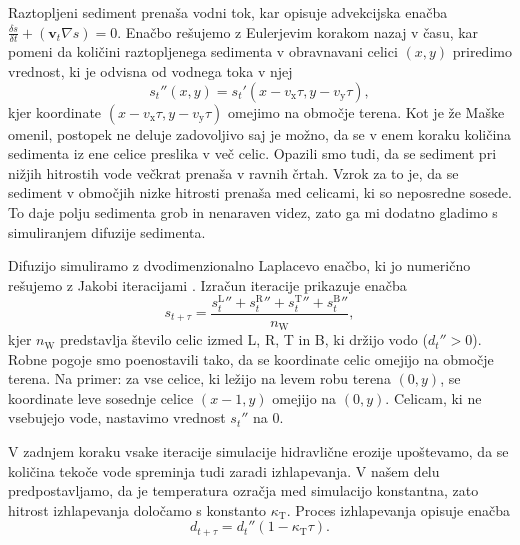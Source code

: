 \documentclass[9pt]{pnas-new}
\renewcommand{\vec}[1]{\ensuremath{\mathbf{#1}}}
\newcommand{\const}[1]{{\ensuremath{\kappa_\mathrm{#1}}}}
\begin{document}
Raztopljeni sediment prenaša vodni tok, kar opisuje advekcijska enačba $\frac{\delta s}{\delta t} + (\vec{v}_t \nabla s) = 0$.
Enačbo rešujemo z Eulerjevim korakom nazaj v času, kar pomeni da količini raztopljenega sedimenta v obravnavani celici $(x,y)$ priredimo vrednost, ki je odvisna od vodnega toka v njej
\begin{equation}
{s_{t}}''(x,y) = {s_{t}}'(x - v_\mathrm{x} \tau, y - v_\mathrm{y} \tau),
\end{equation}
kjer koordinate $(x - v_\mathrm{x} \tau, y - v_\mathrm{y} \tau)$ omejimo na območje terena. Kot je že Maške \cite{maske_2013} omenil, postopek ne deluje zadovoljivo saj je možno, da se v enem koraku količina sedimenta iz ene celice preslika v več celic. Opazili smo tudi, da se sediment pri nižjih hitrostih vode večkrat prenaša v ravnih črtah. Vzrok za to je, da se sediment v območjih nizke hitrosti prenaša med celicami, ki so neposredne sosede. To daje polju sedimenta grob in nenaraven videz, zato ga mi dodatno gladimo s simuliranjem difuzije sedimenta. 

Difuzijo simuliramo z dvodimenzionalno Laplacevo enačbo, ki jo numerično rešujemo z Jakobi iteracijami \cite{laplace_gpu}. Izračun iteracije prikazuje enačba 
\begin{equation} \label{eq:jakobi_iter}
s_{t+\tau} = \frac{{s^\mathrm{L}_{t}}'' + {s^\mathrm{R}_{t}}'' + {s^\mathrm{T}_{t}}'' + {s^\mathrm{B}_{t}}''}{n_\mathrm{W}},
\end{equation}
kjer $n_\mathrm{W}$ predstavlja število celic izmed L, R, T in B, ki držijo vodo (${d_{t}}'' > 0$). Robne pogoje smo poenostavili tako, da se koordinate celic omejijo na območje terena. Na primer: za vse celice, ki ležijo na levem robu terena $(0, y)$, se koordinate leve sosednje celice $(x-1, y)$ omejijo na $(0, y)$. Celicam, ki ne vsebujejo vode, nastavimo vrednost ${s_{t}}''$ na 0.

V zadnjem koraku vsake iteracije simulacije hidravlične erozije upoštevamo, da se količina tekoče vode spreminja tudi zaradi izhlapevanja. V našem delu predpostavljamo, da je temperatura ozračja med simulacijo konstantna, zato hitrost izhlapevanja določamo s konstanto $\kappa_\mathrm{T}$. Proces izhlapevanja opisuje enačba
\begin{equation}
d_{t + \tau} = {d_{t}}''(1 - \const{T} \tau).
\end{equation}
\end{document}
